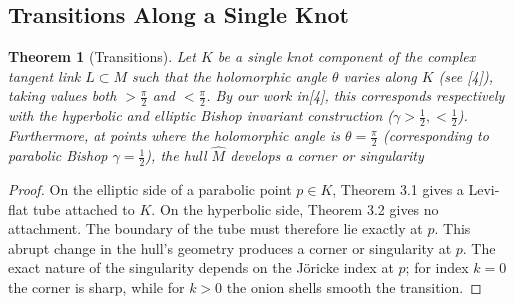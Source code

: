 \documentclass[10pt,a4paper]{amsart}
\newtheorem{theorem}{Theorem}
\begin{document}
\subsection{Transitions Along a Single Knot}
\begin{theorem}[Transitions]Let $K$ be a single knot component of the complex tangent link $L\subset M$ such that the holomorphic angle $\theta$ varies along $K$ (see [4]), taking values both $> \frac{\pi}{2}$ and $< \frac{\pi}{2}$. By our work in[4], this corresponds respectively with the hyperbolic and elliptic Bishop invariant construction ($\gamma>\frac{1}{2}, <\frac{1}{2}$). Furthermore, at points where the holomorphic angle is $\theta = \frac{\pi}{2}$ (corresponding to parabolic Bishop $\gamma=\frac{1}{2}$), the hull $\hat{M}$ develops a corner or singularity\end{theorem}
\begin{proof}On the elliptic side of a parabolic point $p \in K$, Theorem 3.1 gives a Levi-flat tube attached to $K$. On the hyperbolic side, Theorem 3.2 gives no attachment. The boundary of the tube must therefore lie exactly at $p$. This abrupt change in the hull's geometry produces a corner or singularity at $p$. The exact nature of the singularity depends on the Jöricke index at $p$; for index $k = 0$ the corner is sharp, while for $k > 0$ the onion shells smooth the transition.\end{proof} 
\end{document}

